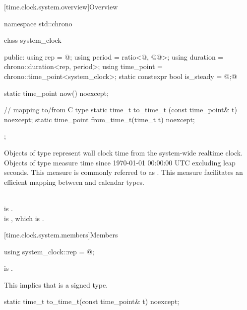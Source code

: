 [time.clock.system.overview]{Overview}
%

\begin{codeblock}
namespace std::chrono {
  class system_clock {
  public:
    using rep        = @\seebelow@;
    using period     = ratio<@\unspecnc@, @\unspec{}@>;
    using duration   = chrono::duration<rep, period>;
    using time_point = chrono::time_point<system_clock>;
    static constexpr bool is_steady = @\unspec;@

    static time_point now() noexcept;

    // mapping to/from C type 
    static time_t      to_time_t  (const time_point& t) noexcept;
    static time_point  from_time_t(time_t t) noexcept;
  };
}
\end{codeblock}

\pnum
Objects of type  represent wall clock time from the system-wide
realtime clock.
Objects of type  measure time since
1970-01-01 00:00:00 UTC excluding leap seconds.
This measure is commonly referred to as .
This measure facilitates an efficient mapping between
 and calendar types.
\begin{example}
\\
 is . \\
 is ,
which is . \\
\end{example}

[time.clock.system.members]{Members}

%
\begin{itemdecl}
using system_clock::rep = @\unspec@;
\end{itemdecl}

\begin{itemdescr}
\pnum
\constraints
{} is .
\begin{note}
This implies that  is a signed type.
\end{note}
\end{itemdescr}

%
\begin{itemdecl}
static time_t to_time_t(const time_point& t) noexcept;
\end{itemdecl}

